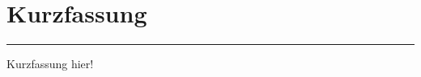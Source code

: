 
\section*{\huge\textbf{Kurzfassung}}
\par\noindent\rule{\textwidth}{0.4pt}
\newline\newline
Kurzfassung hier! 

\newpage
